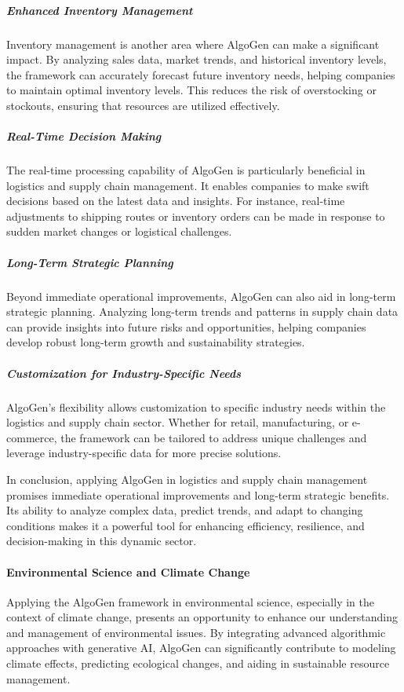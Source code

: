 \documentclass{article}
\begin{document}
\subparagraph{Enhanced Inventory Management}
Inventory management is another area where AlgoGen can make a significant impact. By analyzing sales data, market trends, and historical inventory levels, the framework can accurately forecast future inventory needs, helping companies to maintain optimal inventory levels. This reduces the risk of overstocking or stockouts, ensuring that resources are utilized effectively.

\subparagraph{Real-Time Decision Making}
The real-time processing capability of AlgoGen is particularly beneficial in logistics and supply chain management. It enables companies to make swift decisions based on the latest data and insights. For instance, real-time adjustments to shipping routes or inventory orders can be made in response to sudden market changes or logistical challenges.

\subparagraph{Long-Term Strategic Planning}
Beyond immediate operational improvements, AlgoGen can also aid in long-term strategic planning. Analyzing long-term trends and patterns in supply chain data can provide insights into future risks and opportunities, helping companies develop robust long-term growth and sustainability strategies.

\subparagraph{Customization for Industry-Specific Needs}
AlgoGen’s flexibility allows customization to specific industry needs within the logistics and supply chain sector. Whether for retail, manufacturing, or e-commerce, the framework can be tailored to address unique challenges and leverage industry-specific data for more precise solutions.

In conclusion, applying AlgoGen in logistics and supply chain management promises immediate operational improvements and long-term strategic benefits. Its ability to analyze complex data, predict trends, and adapt to changing conditions makes it a powerful tool for enhancing efficiency, resilience, and decision-making in this dynamic sector.



\paragraph{Environmental Science and Climate Change}
Applying the AlgoGen framework in environmental science, especially in the context of climate change, presents an opportunity to enhance our understanding and management of environmental issues. By integrating advanced algorithmic approaches with generative AI, AlgoGen can significantly contribute to modeling climate effects, predicting ecological changes, and aiding in sustainable resource management.
\end{document}
